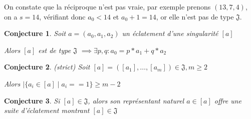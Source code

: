 \documentclass{article}
\newtheorem{conjecture}{Conjecture}
\begin{document}
On constate que la réciproque n'est pas vraie, par exemple prenons $(13, 7, 4)$, on a $s = 14$, vérifiant donc $a_0 < 14$ et $a_0 + 1 = 14$, or elle n'est pas de type $\mathfrak{J}$.

\begin{conjecture}
    Soit $a=(a_0, a_1, a_2)$ un éclatement d'une singularité $[a]$

    Alors $[a]$ est de type $\mathfrak{J}$ $\implies \exists p, q: a_0 = p*a_1 + q*a_2$
\end{conjecture}

\begin{conjecture}
    (strict) Soit $[a] = ([a_1], \dots, [a_m]) \in \mathfrak{J}, m \geq 2$

    Alors $|\{ a_i \in [a] \mid a_i == 1 \} \geq m - 2$
\end{conjecture}

\begin{conjecture}
    Si $[a] \in \mathfrak{J}$, alors son représentant naturel $a \in [a]$ offre une suite d'éclatement montrant $[a] \in \mathfrak{J}$
\end{conjecture}
\end{document}
